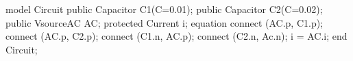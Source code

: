 \begin{boxedverbatim}
model Circuit
  public Capacitor C1(C=0.01);
  public Capacitor C2(C=0.02);
  public VsourceAC AC;
  protected Current i;
equation
  connect (AC.p, C1.p);
  connect (AC.p, C2.p);
  connect (C1.n, AC.p);
  connect (C2.n, Ac.n);
  i = AC.i;
end Circuit;
\end{boxedverbatim}
